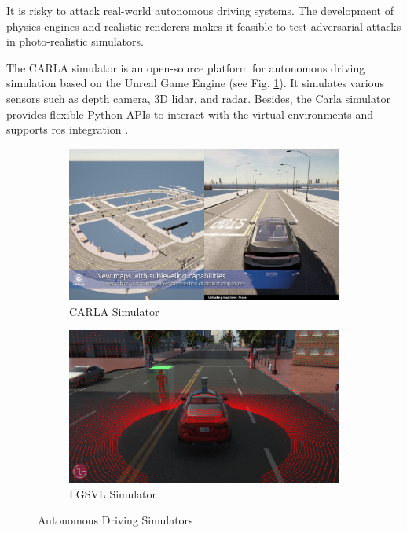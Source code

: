 It is risky to attack real-world autonomous driving systems. The development of physics engines and realistic renderers makes it feasible to test adversarial attacks in photo-realistic simulators.
 

The CARLA simulator is an open-source platform for autonomous driving simulation based on the Unreal Game Engine (see Fig. \ref{fig:carla_intro}). It simulates various sensors such as depth camera, 3D lidar, and radar. Besides, the Carla simulator provides flexible Python APIs to interact with the virtual environments and supports \acrfull{ros} integration \citep{Dosovitskiy17}.

\begin{figure}[H]
\centering
\begin{subfigure}[b]{0.49\textwidth}
    \centering
    \includegraphics[width=\textwidth]{figures/chapter_intro/carla.jpg}
    \caption{CARLA Simulator \citep{Dosovitskiy17}}
    \label{fig:carla_intro}
\end{subfigure}
\hfill
\begin{subfigure}[b]{0.49\textwidth}
    \centering
    \includegraphics[width=\textwidth]{figures/chapter_intro/lgsvl.png}
    \caption{LGSVL Simulator\citep{rong2020lgsvl}}
    \label{fig:lvsvl}
\end{subfigure}
\hfill
\caption{Autonomous Driving Simulators}
\label{fig.simulator}
\end{figure}

